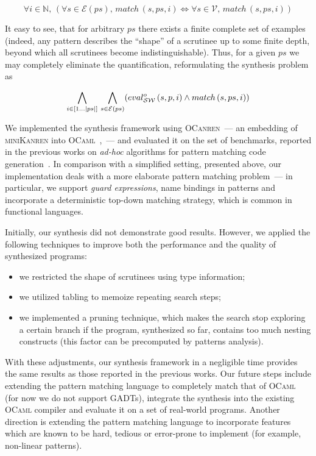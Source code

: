  \[
 \forall i\in\mathbb{N},\,(\forall s\in\mathcal{E}(ps),\,match\, (s, ps, i) \Leftrightarrow \forall s\in\mathcal{V},\,match\, (s, ps, i))
 \]
 
 It easy to see, that for arbitrary $ps$ there exists a finite complete set of examples (indeed, any pattern describes the ``shape''
 of a scrutinee up to some finite depth, beyond which all scrutinees become indistinguishable). Thus, for a given $ps$ we may
 completely eliminate the quantification, reformulating the synthesis problem as
 
 \[
 \bigwedge_{i\in[1\dots|ps|]}\,\bigwedge_{s\in\mathcal{E}(ps)} (eval^o_{\mathcal{S}\mathcal{W}}\, (s, p, i) \wedge match\, (s, ps, i))
 \]
 
 We implemented the synthesis framework using \textsc{OCanren}~--- an embedding of \textsc{miniKanren} into \textsc{OCaml}~\cite{ocanren},~---
 and evaluated it on the set of benchmarks, reported in the previous works on \emph{ad-hoc} algorithms for pattern matching
 code generation~\cite{maranget2001,maranget2008}. In comparison with a simplified setting, presented above, our implementation
 deals with a more elaborate pattern matching problem~--- in particular, we support \emph{guard expressions}, name bindings in
 patterns and incorporate a deterministic top-down matching strategy, which is common in functional languages.
 
 Initially, our synthesis did not demonstrate good results. However, we applied the following techniques to improve both the performance
 and the quality of synthesized programs:
 
 \begin{itemize}
 \item we restricted the shape of scrutinees using type information;
 \item we utilized tabling to memoize repeating search steps;
 \item we implemented a pruning technique, which makes the search stop exploring a certain branch if the program, synthesized so far,
   contains too much nesting constructs (this factor can be precomputed by patterns analysis).
 \end{itemize}
 
 With these adjustments, our synthesis framework in a negligible time provides the same results as those reported in the previous works.
 Our future steps include extending the pattern matching language to completely match that of \textsc{OCaml} (for
 now we do not support GADTs), integrate the synthesis into the existing \textsc{OCaml} compiler and evaluate it on a
 set of real-world programs. Another direction is extending the pattern matching language to incorporate features which
 are known to be hard, tedious or error-prone to implement (for example, non-linear patterns).
 
